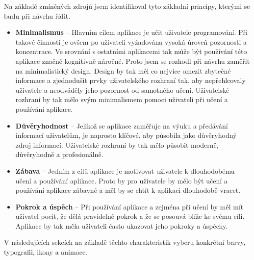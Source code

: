 Na základě zmíněných zdrojů jsem identifikoval tyto základní principy, kterými se budu při návrhu řídit.

\begin{itemize}
    \item \textbf{Minimalismus} -- Hlavním cílem aplikace je učit uživatele programování. Při takové činnosti je ovšem po uživateli vyžadována vysoká úroveň pozornosti a koncentrace. Ve srovnání s ostatními aplikacemi tak může být používání této aplikace značně kognitivně náročné. Proto jsem se rozhodl při návrhu zaměřit na minimalistický design. Design by tak měl co nejvíce omezit zbytečné informace a zjednodušit prvky uživatelského rozhraní tak, aby nepřehlcovaly uživatele a neodváděly jeho pozornost od samotného učení. Uživatelské rozhraní by tak mělo svým minimalismem pomoci uživateli při učení a používání aplikace. %
    \item \textbf{Důvěryhodnost} -- Jelikož se aplikace zaměřuje na výuku a předávání informací uživatelům, je naprosto klíčové, aby působila jako důvěryhodný zdroj informací. Uživatelské rozhraní by tak mělo působit moderně, důvěryhodně a profesionálně. %
    \item \textbf{Zábava} -- Jedním z cílů aplikace je motivovat uživatele k dlouhodobému učení a používání aplikace. Proto by pro uživatele by mělo být učení a používání aplikace zábavné a měl by se chtít k aplikaci dlouhodobě vracet. %
    \item \textbf{Pokrok a úspěch} -- Při používání aplikace a zejména při učení by měl mít uživatel pocit, že dělá pravidelně pokrok a že se posouvá blíže ke svému cíli. Aplikace by tak měla uživateli často ukazovat jeho pokroky a úspěchy.
\end{itemize}

V následujících sekcích na základě těchto charakteristik vyberu konkrétní barvy, typografii, ikony a animace.

